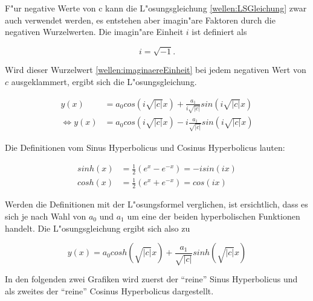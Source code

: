 \begin{refsection}
F"ur negative Werte von c kann die L"osungsgleichung \ref{wellen:LSGleichung} 
zwar auch verwendet werden, es entstehen aber imagin"are Faktoren durch die 
negativen Wurzelwerten. Die imagin"are Einheit $i$ ist definiert als

\begin{equation}
	i = \sqrt{-1}.
	\label{wellen:imaginaereEinheit}
\end{equation}

Wird dieser Wurzelwert \ref{wellen:imaginaereEinheit} bei jedem negativen Wert 
von $c$ ausgeklammert, ergibt sich die L"osungsgleichung.

\begin{equation}
	\begin{split}
	y(x) &= a_0 cos(i\sqrt{|c|}x) + \frac{a_1}{i\sqrt{|c|}}sin(i\sqrt{|c|}x) \\
	\Leftrightarrow
	y(x) &= a_0 cos(i\sqrt{|c|}x) - i\frac{a_1}{\sqrt{|c|}}sin(i\sqrt{|c|}x)
	\end{split}	
	\label{wellen:LSGnegcWerte}
\end{equation}

Die Definitionen vom Sinus Hyperbolicus und Cosinus Hyperbolicus lauten:

\begin{equation*}
	\begin{split}
	sinh(x) &= \frac{1}{2} (e^x - e^{-x}) = -i sin(ix)\\
	cosh(x) &= \frac{1}{2} (e^x + e^{-x}) = cos (ix)
	\end{split}
\end{equation*}

Werden die Definitionen mit der L"osungsformel verglichen, ist ersichtlich, 
dass es sich je nach Wahl von $a_0$ und $a_1$ um eine der beiden hyperbolischen 
Funktionen handelt. Die L"osungsgleichung ergibt sich also zu

\begin{equation*}
	y(x) = a_0 cosh(\sqrt{|c|}x) + \frac{a_1}{\sqrt{|c|}}sinh(\sqrt{|c|}x)
\end{equation*}

In den folgenden zwei Grafiken wird zuerst der ``reine'' Sinus Hyperbolicus und 
als zweites der ``reine'' Cosinus Hyperbolicus dargestellt.


\end{refsection}

